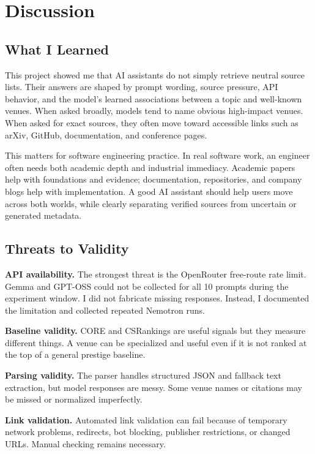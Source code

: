 \documentclass[acmsmall,review,nonacm]{acmart}
\begin{document}
\section{Discussion}

\subsection{What I Learned}

This project showed me that AI assistants do not simply retrieve neutral
source lists. Their answers are shaped by prompt wording, source pressure, API
behavior, and the model's learned associations between a topic and well-known
venues. When asked broadly, models tend to name obvious high-impact venues.
When asked for exact sources, they often move toward accessible links such as
arXiv, GitHub, documentation, and conference pages.

This matters for software engineering practice. In real software work, an
engineer often needs both academic depth and industrial immediacy. Academic
papers help with foundations and evidence; documentation, repositories, and
company blogs help with implementation. A good AI assistant should help users
move across both worlds, while clearly separating verified sources from
uncertain or generated metadata.

\subsection{Threats to Validity}

\textbf{API availability.} The strongest threat is the OpenRouter free-route
rate limit. Gemma and GPT-OSS could not be collected for all 10 prompts during
the experiment window. I did not fabricate missing responses. Instead, I
documented the limitation and collected repeated Nemotron runs.

\textbf{Baseline validity.} CORE and CSRankings are useful signals but they
measure different things. A venue can be specialized and useful even if it is
not ranked at the top of a general prestige baseline.

\textbf{Parsing validity.} The parser handles structured JSON and fallback
text extraction, but model responses are messy. Some venue names or citations
may be missed or normalized imperfectly.

\textbf{Link validation.} Automated link validation can fail because of
temporary network problems, redirects, bot blocking, publisher restrictions,
or changed URLs. Manual checking remains necessary.
\end{document}
